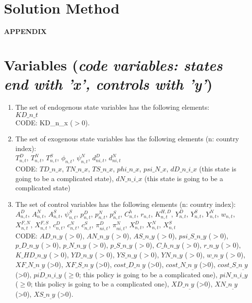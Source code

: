 \documentclass[12pt, bibtotoc, tablecaptionabove, figurecaptionabove, fleqn]{article}
\begin{document}
\section{Solution Method}


\newpage
\small



\clearpage\newpage

\appendix
\begin{center}
	\Large
	\textbf{APPENDIX}\\
\end{center}

\normalsize
\section{Variables (\emph{code variables: states end with 'x', controls with 'y'})}

\begin{enumerate}
	\item The set of endogenous state variables has the following elements: \\
	 $KD\_n\_t$\\
	 CODE: KD\_n\_x ($>0$).
	\item The set of exogenous state variables has the following elements (n: country index): \\
	 $T^D_{n,t}$, $T^N_{n,t}$, $T^S_{n,t}$, $\phi_{n,t}$, $\psi_{n,t}^N$, $d^D_{ni,t}$, $d^N_{ni,t}$ \\
	 CODE: $TD\_n\_x$, $TN\_n\_x$, $TS\_n\_x$, $phi\_n\_x$, $psi\_N\_x$, $dD\_n\_i\_x$ (this state is going to be a complicated state), $dN\_n\_i\_x$ (this state is going to be a complicated state) \\
	 
	 \item The set of control variables has the following elements (n: country index): \\
	 $A_{n, t}^{D}$, $A_{n, t}^{N}$, $A_{n, t}^{S}$, $\psi_{n,t}^S$, $p^{D}_{n,t}$, $p^{N}_{n,t}$, $p^{S}_{n,t}$, $C^h_{n,t}$, $r_{n,t}$, $K^{H,D}_{n,t}$, $Y^D_{n,t}$, $Y^S_{n,t}$, $Y^N_{n,t}$, $w_{n,t}$, $X^{F,N}_{n,t}$, $X^{F,S}_{n,t}$, $c^{D}_{n,t}$, $c^{N}_{n,t}$, $c^{S}_{n,t}$, $\pi^D_{ni,t}$, $\pi^N_{ni,t}$, $X^D_{n,t}$, $X^N_{n,t}$, $X^S_{n,t}$\\
	 
	 CODE: $AD\_n\_y$ ($>0$), $AN\_n\_y$ ($>0$), $AS\_n\_y$ ($>0$), 
	 $psi\_S\_n\_y$ ($>0$), $p\_D\_n\_y$ ($>0$), $p\_N\_n\_y$ ($>0$), $p\_S\_n\_y$ ($>0$), $C\_h\_n\_y$ ($>0$), $r\_n\_y$ ($>0$), $K\_HD\_n\_y$ ($>0$), $YD\_n\_y$ ($>0$), $YS\_n\_y$ ($>0$), $YN\_n\_y$ ($>0$), $w\_n_\_y$ ($>0$), $XF\_N\_n_\_y$ (>0), $XF\_S\_n_\_y$ (>0), $cost\_D\_n_\_y$ (>0), $cost\_N\_n_\_y$ (>0), $cost\_S\_n_\_y$ (>0), $piD\_n\_i\_y$ ($\geq 0$; this policy is going to be a complicated one), $piN\_n\_i\_y$ ($\geq 0$; this policy is going to be a complicated one), $XD\_n_\_y$ (>0), $XN\_n_\_y$ (>0), $XS\_n_\_y$ (>0).   \\
\end{enumerate}
\end{document}
